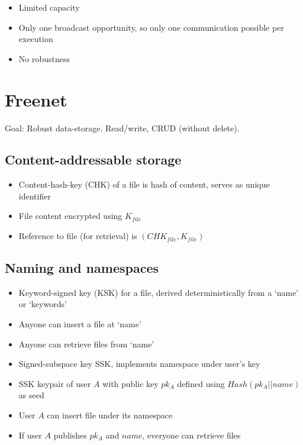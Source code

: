 \documentclass[a4paper]{scrreprt}
\begin{document}
\begin{itemize}
		\item Limited capacity
		\item Only one broadcast opportunity, so only one communication
				possible per execution
		\item No robustness
\end{itemize}

\section{Freenet}

Goal: Robust data-storage. Read/write, CRUD (without delete).

\subsection{Content-addressable storage}

\begin{itemize}
		\item Content-hash-key (CHK) of a file is hash of content, serves as
				unique identifier
		\item File content encrypted using $K_{file}$
		\item Reference to file (for retrieval) is $(CHK_{file}, K_{file})$
\end{itemize}

\subsection{Naming and namespaces}

\begin{itemize}
		\item Keyword-signed key (KSK) for a file, derived deterministically
				from a `name' or `keywords'
		\item Anyone can insert a file at `name'
		\item Anyone can retrieve files from `name'
		\item Signed-subspace key SSK, implements namespace under user's key
		\item SSK keypair of user $A$ with public key $pk_A$ defined using $Hash(pk_A || name)$ as seed
		\item User $A$ can insert file under its namespace
		\item If user $A$ publishes $pk_A$ and $name$, everyone can retrieve files
\end{itemize}
\end{document}
